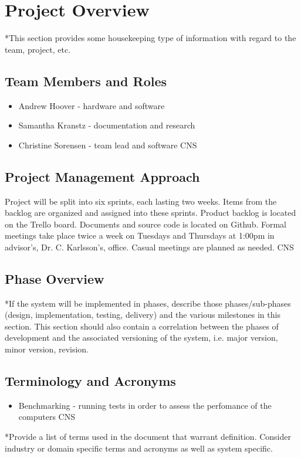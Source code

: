 

\chapter{Project Overview}
*This section provides some housekeeping type of information with regard to the 
team, project, etc. 



\section{Team Members and Roles}
\begin{itemize}
	\item Andrew Hoover - hardware and software
	\item Samantha Kranstz - documentation and research
	\item Christine Sorensen - team lead and software CNS
\end{itemize}

\section{Project  Management Approach}
Project will be split into six sprints, each lasting two weeks. Items from the backlog are organized and assigned into these sprints. \newline \newline Product backlog is located on the Trello board. Documents and source code is located on Github. \newline \newline Formal meetings take place twice a week on Tuesdays and Thursdays at 1:00pm in advisor's, Dr. C. Karlsson's, office. Casual meetings are planned as needed. CNS

\section{Phase  Overview}


*If the system will be implemented in phases, describe those phases/sub-phases (design, 
implementation, testing, delivery) and the various milestones in this section. 
 This section should also contain a correlation between the phases of development 
and the associated versioning of the system, i.e. major version, minor version, 
revision. 

\section{Terminology and Acronyms}
\begin{itemize}
	\item Benchmarking - running tests in order to assess the perfomance of the computers CNS
\end{itemize}


*Provide a list of terms used in the document that warrant definition.  Consider 
industry or domain specific terms and acronyms as well as system specific. 
